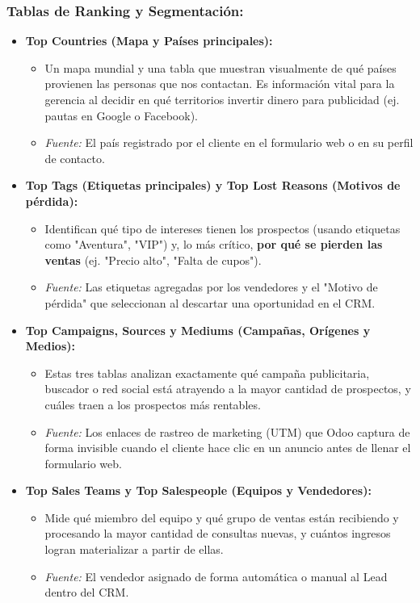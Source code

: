 \subsubsection*{Tablas de Ranking y Segmentación:}
\begin{itemize}[leftmargin=*]
    \item \textbf{Top Countries (Mapa y Países principales):}
    \begin{itemize}
        \item Un mapa mundial y una tabla que muestran visualmente de qué países provienen las personas que nos contactan. Es información vital para la gerencia al decidir en qué territorios invertir dinero para publicidad (ej. pautas en Google o Facebook).
        \item \textit{Fuente:} El país registrado por el cliente en el formulario web o en su perfil de contacto.
    \end{itemize}
    \item \textbf{Top Tags (Etiquetas principales) y Top Lost Reasons (Motivos de pérdida):}
    \begin{itemize}
        \item Identifican qué tipo de intereses tienen los prospectos (usando etiquetas como "Aventura", "VIP") y, lo más crítico, \textbf{por qué se pierden las ventas} (ej. "Precio alto", "Falta de cupos").
        \item \textit{Fuente:} Las etiquetas agregadas por los vendedores y el "Motivo de pérdida" que seleccionan al descartar una oportunidad en el CRM.
    \end{itemize}
    \item \textbf{Top Campaigns, Sources y Mediums (Campañas, Orígenes y Medios):}
    \begin{itemize}
        \item Estas tres tablas analizan exactamente qué campaña publicitaria, buscador o red social está atrayendo a la mayor cantidad de prospectos, y cuáles traen a los prospectos más rentables.
        \item \textit{Fuente:} Los enlaces de rastreo de marketing (UTM) que Odoo captura de forma invisible cuando el cliente hace clic en un anuncio antes de llenar el formulario web.
    \end{itemize}
    \item \textbf{Top Sales Teams y Top Salespeople (Equipos y Vendedores):}
    \begin{itemize}
        \item Mide qué miembro del equipo y qué grupo de ventas están recibiendo y procesando la mayor cantidad de consultas nuevas, y cuántos ingresos logran materializar a partir de ellas.
        \item \textit{Fuente:} El vendedor asignado de forma automática o manual al Lead dentro del CRM.
    \end{itemize}
\end{itemize}

